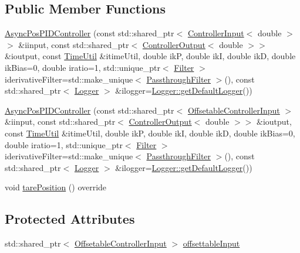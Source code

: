 \subsection*{Public Member Functions}
\begin{DoxyCompactItemize}
\item 
\mbox{\hyperlink{classokapi_1_1AsyncPosPIDController_ad66e9890d43f60ed304a356b52baad80}{Async\+Pos\+P\+I\+D\+Controller}} (const std\+::shared\+\_\+ptr$<$ \mbox{\hyperlink{classokapi_1_1ControllerInput}{Controller\+Input}}$<$ double $>$$>$ \&iinput, const std\+::shared\+\_\+ptr$<$ \mbox{\hyperlink{classokapi_1_1ControllerOutput}{Controller\+Output}}$<$ double $>$$>$ \&ioutput, const \mbox{\hyperlink{classokapi_1_1TimeUtil}{Time\+Util}} \&itime\+Util, double ikP, double ikI, double ikD, double ik\+Bias=0, double iratio=1, std\+::unique\+\_\+ptr$<$ \mbox{\hyperlink{classokapi_1_1Filter}{Filter}} $>$ iderivative\+Filter=std\+::make\+\_\+unique$<$ \mbox{\hyperlink{classokapi_1_1PassthroughFilter}{Passthrough\+Filter}} $>$(), const std\+::shared\+\_\+ptr$<$ \mbox{\hyperlink{classokapi_1_1Logger}{Logger}} $>$ \&ilogger=\mbox{\hyperlink{classokapi_1_1Logger_a5053cf778b4b55acba788a3797dc96d2}{Logger\+::get\+Default\+Logger}}())
\item 
\mbox{\hyperlink{classokapi_1_1AsyncPosPIDController_a4038bde6275c8c69fc22edfbead726d2}{Async\+Pos\+P\+I\+D\+Controller}} (const std\+::shared\+\_\+ptr$<$ \mbox{\hyperlink{classokapi_1_1OffsetableControllerInput}{Offsetable\+Controller\+Input}} $>$ \&iinput, const std\+::shared\+\_\+ptr$<$ \mbox{\hyperlink{classokapi_1_1ControllerOutput}{Controller\+Output}}$<$ double $>$$>$ \&ioutput, const \mbox{\hyperlink{classokapi_1_1TimeUtil}{Time\+Util}} \&itime\+Util, double ikP, double ikI, double ikD, double ik\+Bias=0, double iratio=1, std\+::unique\+\_\+ptr$<$ \mbox{\hyperlink{classokapi_1_1Filter}{Filter}} $>$ iderivative\+Filter=std\+::make\+\_\+unique$<$ \mbox{\hyperlink{classokapi_1_1PassthroughFilter}{Passthrough\+Filter}} $>$(), const std\+::shared\+\_\+ptr$<$ \mbox{\hyperlink{classokapi_1_1Logger}{Logger}} $>$ \&ilogger=\mbox{\hyperlink{classokapi_1_1Logger_a5053cf778b4b55acba788a3797dc96d2}{Logger\+::get\+Default\+Logger}}())
\item 
void \mbox{\hyperlink{classokapi_1_1AsyncPosPIDController_a4d5bb5646dcdc3bc80f15c1d6ae72747}{tare\+Position}} () override
\end{DoxyCompactItemize}
\subsection*{Protected Attributes}
\begin{DoxyCompactItemize}
\item 
std\+::shared\+\_\+ptr$<$ \mbox{\hyperlink{classokapi_1_1OffsetableControllerInput}{Offsetable\+Controller\+Input}} $>$ \mbox{\hyperlink{classokapi_1_1AsyncPosPIDController_a6e7a064075af197d89f4369e3c8e48b6}{offsettable\+Input}}
\end{DoxyCompactItemize}
